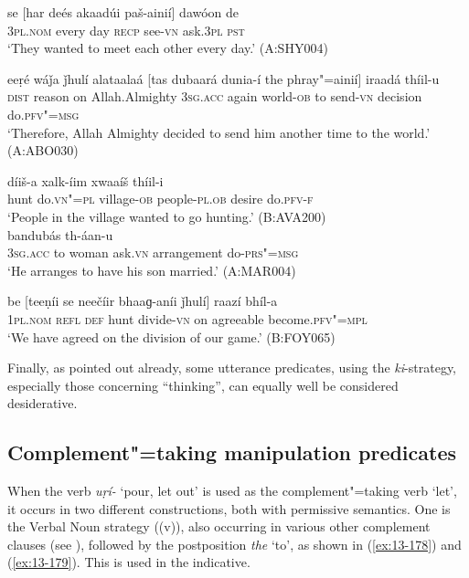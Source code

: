 \begin{exe}
\ex
\label{ex:13-173}
\gll se [har deés akaadúi paš-ainií] dawóon de \\
\textsc{3pl.nom} every day \textsc{recp} see-\textsc{vn} ask.\textsc{3pl} \textsc{pst} \\
\glt `They wanted to meet each other every day.' (A:SHY004)

\ex
\label{ex:13-174}
\gll eeṛé wáǰa ǰhulí alataalaá [tas dubaará dunia-í  the phray"=ainií] iraadá thíil-u \\
\textsc{dist} reason on Allah.Almighty \textsc{3sg.acc} again world-\textsc{ob}  to send-\textsc{vn} decision do.\textsc{pfv"=msg}  \\
\glt `Therefore, Allah Almighty decided to send him another time to the world.' (A:ABO030)

\ex
\label{ex:13-175}
 díiš-a xalk-íim xwaaíš thíil-i \\
hunt do.\textsc{vn"=pl} village-\textsc{ob} people-\textsc{pl.ob} desire do.\textsc{pfv-f} \\
\glt `People in the village wanted to go hunting.' (B:AVA200) \\

\ex
\label{ex:13-176}
 bandubás th-áan-u \\
\textsc{3sg.acc} to woman ask.\textsc{vn}  arrangement do-\textsc{prs"=msg} \\
\glt `He arranges to have his son married.' (A:MAR004)

\ex
\label{ex:13-177}
\gll be [teeṇíi se neečíir bhaaɡ-aníi ǰhulí]  raazí bhíl-a \\
\textsc{1pl.nom} \textsc{refl} \textsc{def} hunt divide-\textsc{vn} on agreeable become.\textsc{pfv"=mpl} \\
\glt `We have agreed on the division of our game.' (B:FOY065) 
\end{exe}

Finally, as pointed out already, some utterance predicates, using the \textit{ki}-strategy, especially those concerning ``thinking'', can equally well be considered desiderative.


\subsection{Complement"=taking manipulation predicates}
\label{subsec:13-5-3}

 When the verb \textit{uṛí-} `pour, let out' is used as the complement"=taking verb `let', it occurs in two different constructions, both with permissive semantics. One is the Verbal Noun strategy ((v)), also occurring in various other complement clauses (see ), followed by the postposition \textit{the} `to', as shown in (\ref{ex:13-178}) and (\ref{ex:13-179}). This is used in the indicative.

